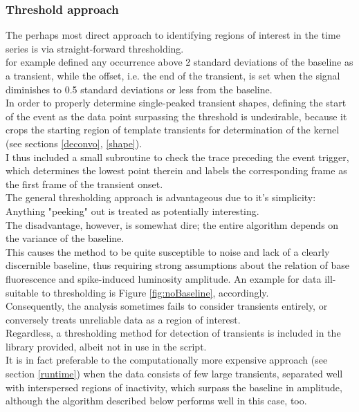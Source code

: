 \documentclass[titlepage]{article}
\begin{document}
\subsubsection{Threshold approach}\label{thresh}
The perhaps most direct approach to identifying regions of interest in the time series is via straight-forward thresholding.\\
\citeauthor{yaksi_reconstruction_2006}\cite{yaksi_reconstruction_2006} for example defined any occurrence above 2 standard deviations of the baseline as a transient, while the offset, i.e. the end of the transient, is set when the signal diminishes to 0.5 standard deviations or less from the baseline.\\
In order to properly determine single-peaked transient shapes, defining the start of the event as the data point surpassing the threshold is undesirable, because it crops the starting region of template transients for determination of the kernel (see sections \ref{deconvo}, \ref{shape}).\\
I thus included a small subroutine to check the trace preceding the event trigger, which determines the lowest point therein and labels the corresponding frame as the first frame of the transient onset.\\
The general thresholding approach is advantageous due to it's simplicity: Anything "peeking" out is treated as potentially interesting.\\
The disadvantage, however, is somewhat dire; the entire algorithm depends on the variance of the baseline.\\
This causes the method to be quite susceptible to noise and lack of a clearly discernible baseline, thus requiring strong assumptions about the relation of base fluorescence and spike-induced luminosity amplitude. An example for data ill-suitable to thresholding is Figure \ref{fig:noBaseline}, accordingly.\\
Consequently, the analysis sometimes fails to consider transients entirely, or conversely treats unreliable data as a region of interest.\\
Regardless, a thresholding method for detection of transients is included in the library provided, albeit not in use in the script.\\
It is in fact preferable to the computationally more expensive approach (see section \ref{runtime}) when the data consists of few large transients, separated well with interspersed regions of inactivity, which surpass the baseline in amplitude, although the algorithm described below performs well in this case, too.
\end{document}
